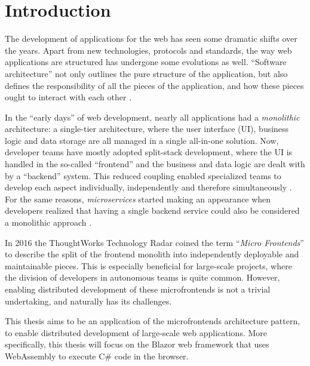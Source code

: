 
\section{Introduction}
\label{sec:introduction}

The development of applications for the web has seen some dramatic shifts over
the years. Apart from new technologies, protocols and standards, the way web
applications are structured has undergone some evolutions as well. ``Software
architecture'' not only outlines the pure structure of the application, but also
defines the responsibility of all the pieces of the application, and how these
pieces ought to interact with each other \autocite{Fedorov_etal_1998}.

In the ``early days'' of web development, nearly all applications had a
\textit{monolithic} architecture: a single-tier architecture, where the user
interface (UI), business logic and data storage are all managed in a single
all-in-one solution. Now, developer teams have mostly adopted split-stack
development, where the UI is handled in the so-called ``frontend'' and the
business and data logic are dealt with by a ``backend'' system. This reduced
coupling enabled specialized teams to develop each aspect individually,
independently and therefore simultaneously \autocite{Dunkley_2016}. For the same
reasons, \textit{microservices} started making an appearance when developers
realized that having a single \gls{backend} service could also be considered a
monolithic approach \autocite{Fowler_Microservices_2014}.

In 2016 the ThoughtWorks Technology Radar \autocite{ThoughtWorks_2020} coined
the term ``\textit{Micro Frontends}'' to describe the split of the frontend
monolith into independently deployable and maintainable pieces. This is
especially beneficial for large-scale projects, where the division of developers
in autonomous teams is quite common. However, enabling distributed development
of these microfrontends is not a trivial undertaking, and naturally has its
challenges.

This thesis aims to be an application of the microfrontends architecture
pattern, to enable distributed development of large-scale web applications. More
specifically, this thesis will focus on the
Blazor web framework that uses
WebAssembly to execute
C\# code in the browser.   

